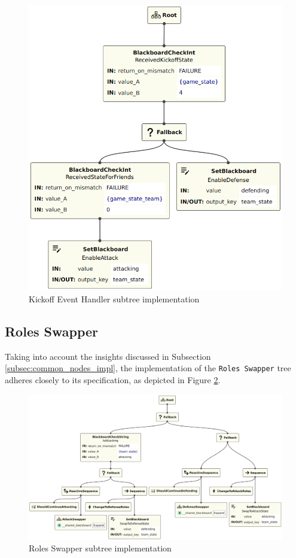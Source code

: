 \begin{figure}[!h]
    \centering
    \includegraphics[width=0.65\linewidth]{chapters/development/images/KickoffEventHandler.png}
    \caption{Kickoff Event Handler subtree implementation}
    \label{fig:kickoff_event_handler_impl}
\end{figure}

\subsection{Roles Swapper}

Taking into account the insights discussed in Subsection \ref{subsec:common_nodes_impl}, the implementation of the \texttt{Roles Swapper} tree adheres closely to its specification, as depicted in Figure \ref{fig:roles_swapper_impl}.

\begin{figure}[!h]
    \centering
    \includegraphics[width=1.0\linewidth]{chapters/development/images/RolesSwapper.png}
    \caption{Roles Swapper subtree implementation}
    \label{fig:roles_swapper_impl}
\end{figure}

